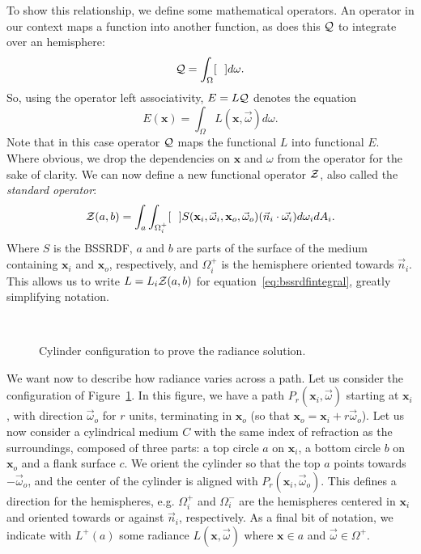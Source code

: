 To show this relationship, we define some mathematical operators. An operator in our context maps a function into another function, as does this  $\mathcal{Q}$ to integrate over an hemisphere:
\begin{equation*}
\mathcal{Q} = \int_\Omega [\ \ ] d\omega.
\end{equation*}
So, using the operator left associativity, $E = L\mathcal{Q}$ denotes the equation
\begin{equation*}
E(\mathbf{x}) = \int_\Omega L(\mathbf{x}, \vec{\omega}) d\omega.
\end{equation*}
Note that in this case operator $\mathcal{Q}$ maps the functional $L$ into functional $E$.
Where obvious, we drop the dependencies on $\mathbf{x}$ and $\omega$ from the operator for the sake of clarity. We can now define a new functional operator $\mathcal{Z}$, also called the \emph{standard operator}:
\begin{equation*}
\mathcal{Z}(a,b) = \int_a \int_{\Omega_i^+} [\ \ ] S(\mathbf{x}_i, \vec{\omega}_i, \mathbf{x}_o, \vec{\omega}_o) (\vec{n}_i \cdot \vec{\omega_i}) d \omega_i d A_i.
\end{equation*}
Where $S$ is the BSSRDF, $a$ and $b$ are parts of the surface of the medium containing $\mathbf{x}_i$ and $\mathbf{x}_o$, respectively, and $\Omega_i^+$ is the hemisphere oriented towards $\vec{n}_i$. This allows us to write $L = L_i \mathcal{Z}(a,b)$ for equation~\ref{eq:bssrdfintegral}, greatly simplifying notation.
%
\begin{figure}
\centering
   \def\svgwidth{0.8\textwidth}
    \\
\caption{Cylinder configuration to prove the radiance solution.} %
\label{fig:cylinder}
\end{figure}
%
We want now to describe how radiance varies across a path. Let us consider the configuration of Figure~\ref{fig:cylinder}. In this figure, we have a path $P_r(\mathbf{x}_i,\vec{\omega})$ starting at $\mathbf{x}_i$, with direction $\vec{\omega}_o$ for $r$ units, terminating in $\mathbf{x}_o$ (so that $\mathbf{x}_o = \mathbf{x}_i + r \vec{\omega}_o$). Let us now consider a cylindrical medium $C$ with the same index of refraction as the surroundings, composed of three parts: a top circle $a$ on $\mathbf{x}_i$, a bottom circle $b$ on $\mathbf{x}_o$ and a flank surface $c$. We orient the cylinder so that the top $a$  points towards $-\vec{\omega}_o$, and the center of the cylinder is aligned with $P_r(\mathbf{x}_i,\vec{\omega}_o)$. This defines a direction for the hemispheres, e.g. $\Omega_i^+$ and $\Omega_i^-$ are the hemispheres centered in $\mathbf{x}_i$  and oriented towards or against $\vec{n}_i$, respectively. As a final bit of notation, we indicate with $L^+(a)$ some radiance $L(\mathbf{x}, \vec{\omega})$ where $\mathbf{x} \in a$ and $\vec{\omega} \in \Omega^+$.

